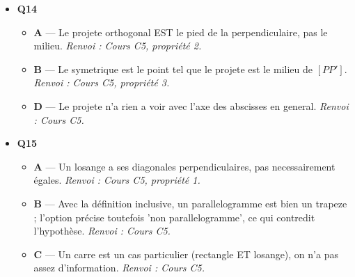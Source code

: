 \begin{itemize}
  \begin{itemize}
    \item \textbf{A} — Oubli du facteur $1/2$ dans la formule de l'aire. \emph{Renvoi : Cours C5, propriété 4.}
    \item \textbf{C} — Erreur de calcul : le determinant vaut $24$, pas $20$. \emph{Renvoi : Cours C5, propriété 4.}
    \item \textbf{D} — L'élève a calcule le determinant $|4 \times 6|=24$ puis l'a multiplie par $2$ au lieu de le diviser par $2$, obtenant $48$. \emph{Renvoi : Cours C5.}
  \end{itemize}
  \item \textbf{Q14}
  \begin{itemize}
    \item \textbf{A} — Le projete orthogonal EST le pied de la perpendiculaire, pas le milieu. \emph{Renvoi : Cours C5, propriété 2.}
    \item \textbf{B} — Le symetrique est le point tel que le projete est le milieu de $[PP']$. \emph{Renvoi : Cours C5, propriété 3.}
    \item \textbf{D} — Le projete n'a rien a voir avec l'axe des abscisses en general. \emph{Renvoi : Cours C5.}
  \end{itemize}
  \item \textbf{Q15}
  \begin{itemize}
    \item \textbf{A} — Un losange a ses diagonales perpendiculaires, pas necessairement égales. \emph{Renvoi : Cours C5, propriété 1.}
    \item \textbf{B} — Avec la définition inclusive, un parallelogramme est bien un trapeze ; l'option précise toutefois 'non parallelogramme', ce qui contredit l'hypothèse. \emph{Renvoi : Cours C5.}
    \item \textbf{C} — Un carre est un cas particulier (rectangle ET losange), on n'a pas assez d'information. \emph{Renvoi : Cours C5.}
  \end{itemize}
\end{itemize}
\fi
